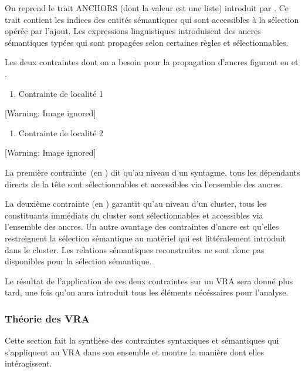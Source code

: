 On reprend le trait ANCHORS (dont la valeur est une liste) introduit par \citet{Kiss2005}. Ce trait contient les indices des entités sémantiques qui sont accessibles à la sélection opérée par l'ajout. Les expressions linguistiques introduisent des ancres sémantiques typées qui sont propagées selon certaines règles et sélectionnables. 

Les deux contraintes dont on a besoin pour la propagation d'ancres figurent en  et . 


\begin{enumerate}
\item \label{bkm:Ref296095245}Contrainte de localité 1 


\end{enumerate}
  [Warning: Image ignored] %
 


\begin{enumerate}
\item \label{bkm:Ref296095248}Contrainte de localité 2


\end{enumerate}
  [Warning: Image ignored] %
 

La première contrainte~(en ) dit qu'au niveau d'un syntagme, tous les dépendants directs de la tête sont sélectionnables et accessibles via l'ensemble des ancres.

La deuxième contrainte (en ) garantit qu'au niveau d'un cluster, tous les constituants immédiats du cluster sont sélectionnables et accessibles via l'ensemble des ancres. Un autre avantage des contraintes d'ancre est qu'elles restreignent la sélection sémantique au matériel qui est littéralement introduit dans le cluster. Les relations sémantiques reconstruites ne sont donc pas disponibles pour la sélection sémantique.

Le résultat de l'application de ces deux contraintes sur un VRA sera donné plus tard, une fois qu'on aura introduit tous les éléments nécéssaires pour l'analyse.

\subsubsection{Théorie des VRA}
Cette section fait la synthèse des contraintes syntaxiques et sémantiques qui s'appliquent au VRA dans son ensemble et montre la manière dont elles intéragissent.  

